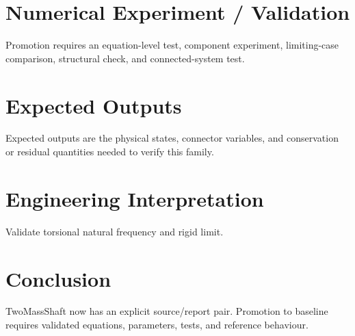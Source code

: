 \documentclass[10pt,a4paper]{article}
\begin{document}
\section{Numerical Experiment / Validation}Promotion requires an equation-level test, component experiment, limiting-case comparison, structural check, and connected-system test.
\section{Expected Outputs}Expected outputs are the physical states, connector variables, and conservation or residual quantities needed to verify this family.
\section{Engineering Interpretation}Validate torsional natural frequency and rigid limit.
\section*{Conclusion}TwoMassShaft now has an explicit source/report pair. Promotion to baseline requires validated equations, parameters, tests, and reference behaviour.
\end{document}
